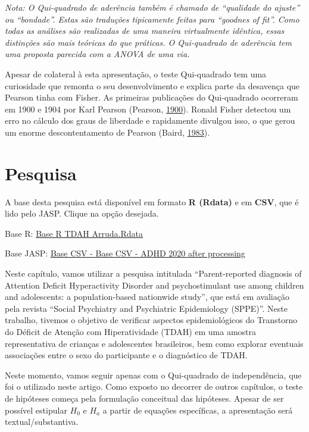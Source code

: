 \documentclass[
]{book}
\begin{document}
\emph{Nota: O Qui-quadrado de aderência também é chamado de ``qualidade
do ajuste'' ou ``bondade''. Estas são traduções tipicamente feitas para
``goodnes of fit''. Como todas as análises são realizadas de uma maneira
virtualmente idêntica, essas distinções são mais teóricas do que
práticas. O Qui-quadrado de aderência tem uma proposta parecida com a
ANOVA de uma via.}

Apesar de colateral à esta apresentação, o teste Qui-quadrado tem uma
curiosidade que remonta o seu desenvolvimento e explica parte da
desavença que Pearson tinha com Fisher. As primeiras publicações do
Qui-quadrado ocorreram em 1900 e 1904 por Karl Pearson (Pearson,
\protect\hyperlink{ref-Pearson1900}{1900}). Ronald Fisher detectou um
erro no cálculo dos graus de liberdade e rapidamente divulgou isso, o
que gerou um enorme descontentamento de Pearson (Baird,
\protect\hyperlink{ref-BAIRD1983}{1983}).

\hypertarget{pesquisa-1}{%
\section{Pesquisa}\label{pesquisa-1}}

\begin{base}

A base desta pesquisa está disponível em formato \textbf{R (Rdata)} e em
\textbf{CSV}, que é lido pelo JASP. Clique na opção desejada.

Base R:
\href{https://github.com/anovabr/mqt/raw/master/bases/Base\%20R\%20TDAH\%20Arruda.RData}{Base
R TDAH Arruda.Rdata}

Base JASP:
\href{https://github.com/anovabr/mqt/raw/master/bases/bases_csv_jasp.zip}{Base
CSV - Base CSV - ADHD 2020 after processing}

\end{base}

Neste capítulo, vamos utilizar a pesquisa intitulada ``Parent-reported
diagnosis of Attention Deficit Hyperactivity Disorder and
psychostimulant use among children and adolescents: a population-based
nationwide study'', que está em avaliação pela revista ``Social
Psychiatry and Psychiatric Epidemiology (SPPE)''. Neste trabalho,
tivemos o objetivo de verificar aspectos epidemiológicos do Transtorno
do Déficit de Atenção com Hiperatividade (TDAH) em uma amostra
representativa de crianças e adolescentes brasileiros, bem como explorar
eventuais associações entre o sexo do participante e o diagnóstico de
TDAH.

Neste momento, vamos seguir apenas com o Qui-quadrado de independência,
que foi o utilizado neste artigo. Como exposto no decorrer de outros
capítulos, o teste de hipóteses começa pela formulação conceitual das
hipóteses. Apesar de ser possível estipular \(H_0\) e \(H_a\) a partir
de equações específicas, a apresentação será textual/substantiva.
\end{document}
